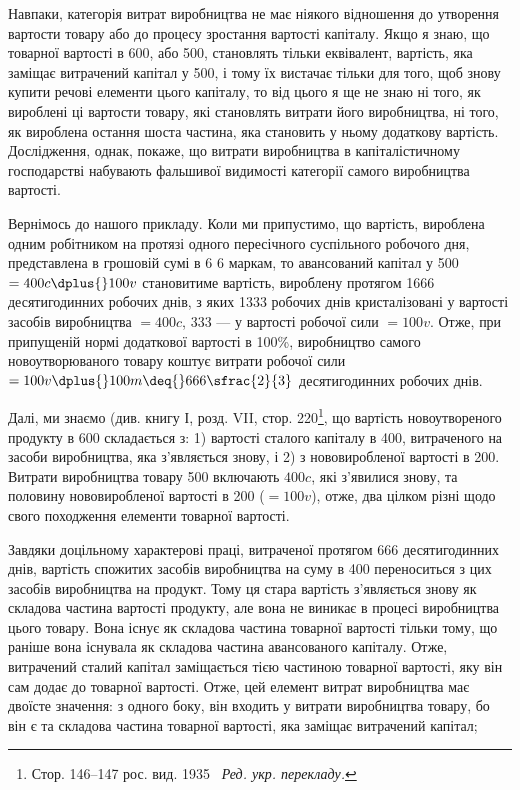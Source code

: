 
Навпаки, категорія витрат виробництва не має ніякого відношення
до утворення вартости товару або до процесу зростання
вартості капіталу. Якщо я знаю, що  товарної вартості
в 600, або 500, становлять
тільки еквівалент, вартість, яка заміщає витрачений капітал
у 500, і тому їх вистачає тільки для того, щоб
знову купити речові елементи цього капіталу, то від цього
я ще не знаю ні того, як вироблені ці   вартости товару, які
становлять витрати його виробництва, ні того, як вироблена
остання шоста частина, яка становить у ньому додаткову вартість.
Дослідження, однак, покаже, що витрати виробництва в капіталістичному
господарстві набувають фальшивої видимості категорії
самого виробництва вартості.

Вернімось до нашого прикладу. Коли ми припустимо, що вартість,
вироблена одним робітником на протязі одного пересічного
суспільного робочого дня, представлена в грошовій сумі
в 6 \deq{} 6 маркам, то авансований капітал у 500 $= 400 c \dplus{} 100 v$ становитиме вартість, вироблену протягом
1666 десятигодинних робочих днів, з яких 1333 робочих
днів кристалізовані у вартості засобів виробництва $= 400 c$,
333  — у вартості робочої сили $= 100v$. Отже, при припущеній
нормі додаткової вартості в 100\%, виробництво самого новоутворюваного
товару коштує витрати робочої сили $= 100v \dplus{} 100m \deq{} 666\sfrac{2}{3}$ десятигодинних робочих днів.

Далі, ми знаємо (див. книгу І, розд. VII, стор. 220\footnote*{Стор. 146--147 рос. вид. 1935~ \emph{Ред. укр. перекладу.}}, що вартість
новоутвореного продукту в 600 складається
з: 1) вартості сталого капіталу в 400,
витраченого на засоби виробництва, яка з’являється знову, і
2) з нововиробленої вартості в 200. Витрати
виробництва товару \deq{} 500 включають $400 c$,
які з’явилися знову, та половину нововиробленої вартості в
200 ($= 100 v$), отже, два цілком різні щодо
свого походження елементи товарної вартості.

Завдяки доцільному характерові праці, витраченої протягом
666  десятигодинних днів, вартість спожитих засобів виробництва
на суму в 400 переноситься з цих
засобів виробництва на продукт. Тому ця стара вартість з’являється
знову як складова частина вартості продукту, але вона
не виникає в процесі виробництва цього товару. Вона існує як
складова частина товарної вартості тільки тому, що раніше вона
існувала як складова частина авансованого капіталу. Отже, витрачений
сталий капітал заміщається тією частиною товарної
вартості, яку він сам додає до товарної вартості. Отже, цей
елемент витрат виробництва має двоїсте значення: з одного боку,
він входить у витрати виробництва товару, бо він є та складова
частина товарної вартості, яка заміщає витрачений капітал;
\parbreak{}  %
